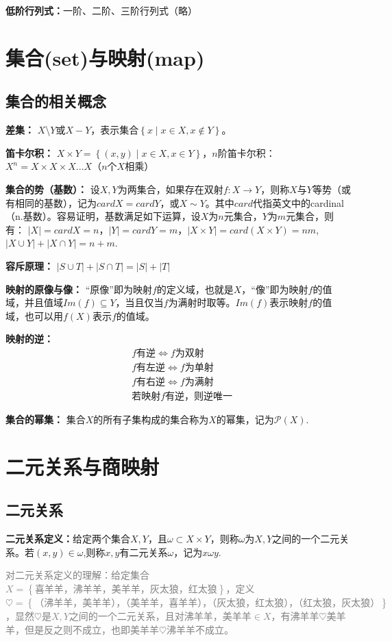 \documentclass[zihao=-4,UTF8]{report}
\begin{document}
\textbf{低阶行列式：}一阶、二阶、三阶行列式（略）

\section{集合(set)与映射(map)}
\subsection{集合的相关概念}

\textbf{差集：}
$X$\textbackslash $Y$或$X-Y$，表示集合$\left \{x\mid x\in X,x\notin Y \right \} $。

\textbf{笛卡尔积：}
\(X \times Y=\left \{(x,y)\mid x\in X,x\in Y \right \} \)，$n$阶笛卡尔积：$X^n=X\times X\times X...X$（$n$个$X$相乘）

\textbf{集合的势（基数）：}
设$X,Y$为两集合，如果存在双射$f:X\to Y$，则称$X$与$Y$等势（或有相同的基数），记为$cardX=cardY$，或$X\sim Y$。其中$card$代指英文中的cardinal（n.基数）。容易证明，基数满足如下运算，设$X$为$n$元集合，$Y$为$m$元集合，则有：
$\left |X \right | = cardX=n\text{，}\left |  Y \right |= cardY =m\text{，}\left | X\times Y \right | =card(X\times Y)=nm$,
$\left | X\cup Y \right |+\left | X \cap  Y \right |=n+m$.

\textbf{容斥原理：}
$\left | S\cup T \right | +\left | S\cap T \right | =\left | S \right | +\left | T \right |$ 

\textbf{映射的原像与像：}
“原像”即为映射$f$的定义域，也就是$X$，“像”即为映射$f$的值域，并且值域$Im(f)\subseteq  Y$，当且仅当$f$为满射时取等。$Im(f)$表示映射$f$的值域，也可以用$f(X)$表示$f$的值域。

\textbf{映射的逆：}
\begin{align*}
    &f\text{有逆}\iff f\text{为双射}\\
    &f\text{有左逆}\iff f\text{为单射}\\
    &f\text{有右逆}\iff f\text{为满射}\\
    &\text{若映射}f\text{有逆，则逆唯一}
\end{align*}

\textbf{集合的幂集：}
集合$X$的所有子集构成的集合称为$X$的幂集，记为$\mathcal{P}(X)$.

\section{二元关系与商映射}
\subsection{二元关系}
\textbf{二元关系定义：}给定两个集合$X,Y$，且$\omega \subset X\times Y$，则称$\omega$为$X,Y$之间的一个二元关系。若$(x,y)\in \omega $,则称$x,y$有二元关系$\omega$，记为$x\omega y$.\par
\textcolor{gray}{对二元关系定义的理解：给定集合$X=\left \{ \text{喜羊羊，沸羊羊，美羊羊，灰太狼，红太狼} \right \} $，定义$\heartsuit =\left \{ \text{（沸羊羊，美羊羊），（美羊羊，喜羊羊），（灰太狼，红太狼），（红太狼，灰太狼）}\right \} $，显然$\heartsuit$是$X,Y$之间的一个二元关系，且对沸羊羊，美羊羊$\in X$，有沸羊羊$\heartsuit $美羊羊，但是反之则不成立，也即美羊羊$\heartsuit $沸羊羊不成立。}
\end{document}
